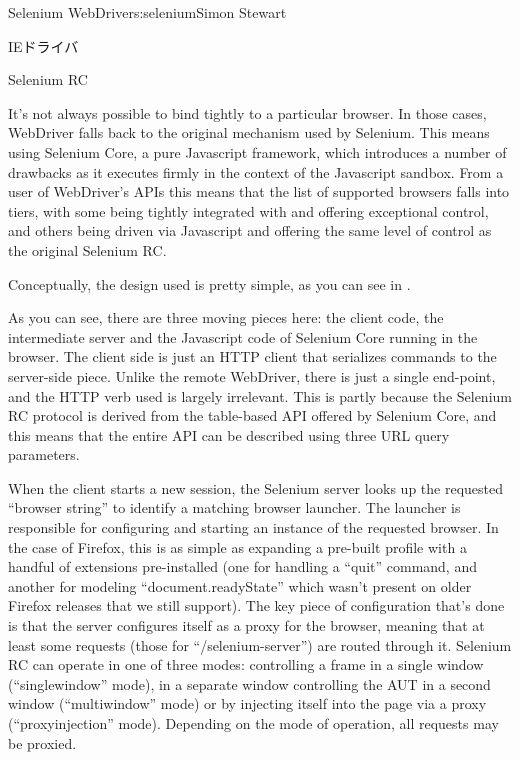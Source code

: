 \begin{aosachapter}{Selenium WebDriver}{s:selenium}{Simon Stewart}
\begin{aosasect1}{IEドライバ}
\end{aosasect1}

\begin{aosasect1}{Selenium RC}

It's not always possible to bind tightly to a particular browser. In
those cases, WebDriver falls back to the original mechanism used by
Selenium. This means using Selenium Core, a pure Javascript framework,
which introduces a number of drawbacks as it executes firmly in the
context of the Javascript sandbox. From a user of WebDriver's APIs
this means that the list of supported browsers falls into tiers, with
some being tightly integrated with and offering exceptional control,
and others being driven via Javascript and offering the same level of
control as the original Selenium RC.

Conceptually, the design used is pretty simple, as you can see in
.


As you can see, there are three moving pieces here: the client code,
the intermediate server and the Javascript code of Selenium Core
running in the browser. The client side is just an HTTP client that
serializes commands to the server-side piece. Unlike the remote
WebDriver, there is just a single end-point, and the HTTP verb used is
largely irrelevant. This is partly because the Selenium RC protocol is
derived from the table-based API offered by Selenium Core, and this
means that the entire API can be described using three URL query
parameters.

When the client starts a new session, the Selenium server looks up the
requested ``browser string'' to identify a matching browser
launcher. The launcher is responsible for configuring and starting an
instance of the requested browser. In the case of Firefox, this is as
simple as expanding a pre-built profile with a handful of extensions
pre-installed (one for handling a ``quit'' command, and another for
modeling ``document.readyState'' which wasn't present on older
Firefox releases that we still support). The key piece of
configuration that's done is that the server configures itself as a
proxy for the browser, meaning that at least some requests (those for
``/selenium-server'') are routed through it.  Selenium RC can operate
in one of three modes: controlling a frame in a single window
(``singlewindow'' mode), in a separate window controlling the AUT in a
second window (``multiwindow'' mode) or by injecting itself into the
page via a proxy (``proxyinjection'' mode). Depending on the mode of
operation, all requests may be proxied.


\end{aosasect1}
\end{aosachapter}
